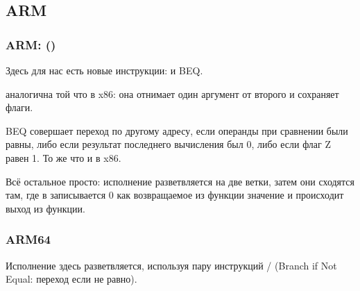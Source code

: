 \subsection{ARM}

\subsubsection{ARM: \OptimizingKeilVI (\ThumbMode)}



Здесь для нас есть новые инструкции: \CMP и \ac{BEQ}.

\CMP аналогична той что в x86: она отнимает один аргумент от второго и сохраняет флаги.


\ac{BEQ} совершает переход по другому адресу, 
если операнды при сравнении были равны, 
либо если результат последнего вычисления был 0, либо если флаг Z равен 1.
То же что и \JZ в x86.

Всё остальное просто: исполнение разветвляется на две ветки, затем они сходятся там, 
где в  записывается 0 как возвращаемое из функции значение и происходит выход из функции.

\subsubsection{ARM64}




Исполнение здесь разветвляется, используя пару инструкций / (Branch if Not Equal: переход если не равно).

